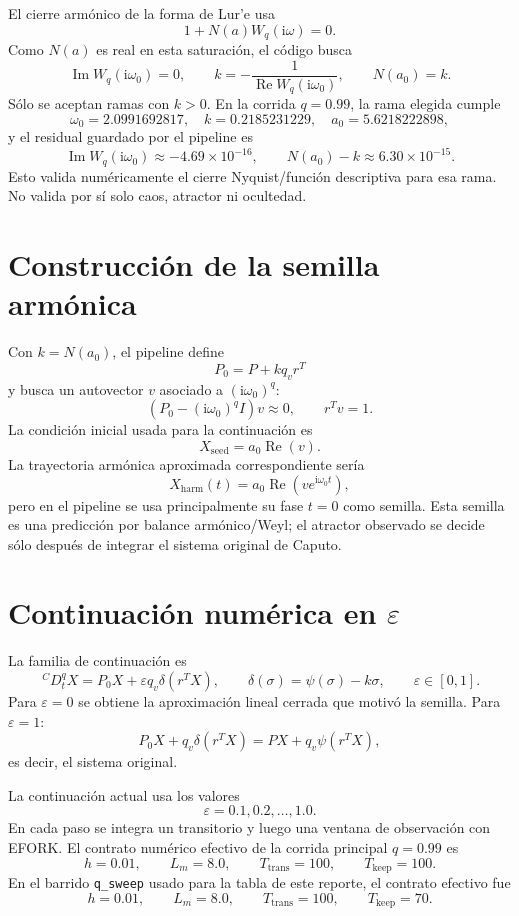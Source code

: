 \documentclass[11pt]{article}
\newcommand{\CaputoD}{\,{}^{C}D_t^q}
\newcommand{\ii}{\mathrm{i}}
\begin{document}
El cierre armónico de la forma de Lur'e usa
\[
1+N(a)W_q(\ii\omega)=0.
\]
Como \(N(a)\) es real en esta saturación, el código busca
\[
\operatorname{Im} W_q(\ii\omega_0)=0,\qquad
k=-\frac{1}{\operatorname{Re}W_q(\ii\omega_0)},\qquad
N(a_0)=k.
\]
Sólo se aceptan ramas con \(k>0\). En la corrida \(q=0.99\), la rama elegida
cumple
\[
\omega_0=2.0991692817,\quad
k=0.2185231229,\quad
a_0=5.6218222898,
\]
y el residual guardado por el pipeline es
\[
\operatorname{Im} W_q(\ii\omega_0)\approx -4.69\times10^{-16},
\qquad
N(a_0)-k\approx 6.30\times10^{-15}.
\]
Esto valida numéricamente el cierre Nyquist/función descriptiva para esa
rama. No valida por sí solo caos, atractor ni ocultedad.

\section{Construcción de la semilla armónica}

Con \(k=N(a_0)\), el pipeline define
\[
P_0=P+kq_vr^T
\]
y busca un autovector \(v\) asociado a \((\ii\omega_0)^q\):
\[
\left(P_0-(\ii\omega_0)^qI\right)v\approx 0,
\qquad r^Tv=1.
\]
La condición inicial usada para la continuación es
\[
X_{\mathrm{seed}}=a_0\operatorname{Re}(v).
\]
La trayectoria armónica aproximada correspondiente sería
\[
X_{\mathrm{harm}}(t)=a_0\operatorname{Re}\left(v e^{\ii\omega_0 t}\right),
\]
pero en el pipeline se usa principalmente su fase \(t=0\) como semilla.
Esta semilla es una predicción por balance armónico/Weyl; el atractor
observado se decide sólo después de integrar el sistema original de Caputo.

\section{Continuación numérica en \(\varepsilon\)}

La familia de continuación es
\[
\CaputoD X
=P_0X+\varepsilon q_v\delta(r^TX),
\qquad
\delta(\sigma)=\psi(\sigma)-k\sigma,
\qquad
\varepsilon\in[0,1].
\]
Para \(\varepsilon=0\) se obtiene la aproximación lineal cerrada que motivó la
semilla. Para \(\varepsilon=1\):
\[
P_0X+q_v\delta(r^TX)
=PX+q_v\psi(r^TX),
\]
es decir, el sistema original.

La continuación actual usa los valores
\[
\varepsilon=0.1,0.2,\ldots,1.0.
\]
En cada paso se integra un transitorio y luego una ventana de observación con
EFORK. El contrato numérico efectivo de la corrida principal \(q=0.99\) es
\[
h=0.01,\qquad L_m=8.0,\qquad T_{\mathrm{trans}}=100,\qquad
T_{\mathrm{keep}}=100.
\]
En el barrido \texttt{q\_sweep} usado para la tabla de este reporte, el
contrato efectivo fue
\[
h=0.01,\qquad L_m=8.0,\qquad T_{\mathrm{trans}}=100,\qquad
T_{\mathrm{keep}}=70.
\]
\end{document}
